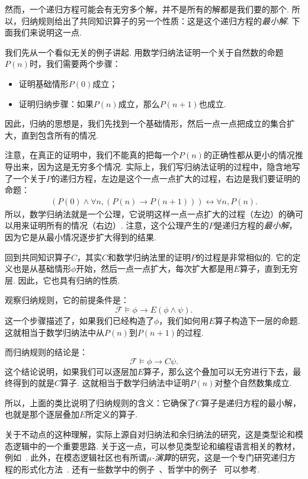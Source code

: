 然而，一个递归方程可能会有无穷多个解，并不是所有的解都是我们要的那个. 所以，归纳规则给出了共同知识算子的另一个性质：这是这个递归方程的\textit{最小解}. 下面我们来说明这一点. 

我们先从一个看似无关的例子讲起. 用数学归纳法证明一个关于自然数的命题$P(n)$时，我们需要两个步骤：
\begin{itemize}
    \item 证明基础情形$P(0)$成立；
    \item 证明归纳步骤：如果$P(n)$成立，那么$P(n+1)$也成立. 
\end{itemize}
因此，归纳的思想是，我们先找到一个基础情形，然后一点一点把成立的集合扩大，直到包含所有的情况. 

注意，在真正的证明中，我们不能真的把每一个$P(n)$的正确性都从更小的情况推导出来，因为这是无穷多个情况. 实际上，我们写归纳法证明的过程中，隐含地写了一个关于$P$的递归方程，左边是这个一点一点扩大的过程，右边是我们要证明的命题：
\begin{align*}
    (P(0)\wedge\forall n,(P(n)\to P(n+1)))\leftrightarrow\forall n,P(n).
\end{align*}
所以，数学归纳法就是一个公理，它说明这样一点一点扩大的过程（左边）的确可以用来证明所有的情况（右边）. 注意，这个公理产生的$P$是递归方程的\textit{最小解}，因为它是从最小情况逐步扩大得到的结果. 

回到共同知识算子$C$，其实$C$和数学归纳法里的证明$P$的过程是非常相似的. 它的定义也是从基础情形$\phi$开始，然后一点一点扩大，每次扩大都是用$E$算子，直到无穷层. 因此，它也具有归纳的性质. 

观察归纳规则，它的前提条件是：
\[\mathcal F\vDash \phi\to E(\phi\wedge\psi).\]
这一个步骤描述了，如果我们已经构造了$\phi$，我们如何用$E$算子构造下一层的命题. 这就相当于数学归纳法中从$P(n)$到$P(n+1)$的过程. 

而归纳规则的结论是：
\[\mathcal  F\vDash \phi\to C\psi.\]
这个结论说明，如果我们可以逐层加$E$算子，那么这个叠加可以无穷进行下去，最终得到的就是$C$算子. 这就相当于数学归纳法中证明$P(n)$对整个自然数集成立. 

所以，上面的类比说明了归纳规则的含义：它确保了$C$算子是递归方程的最小解，也就是那个逐层叠加$E$所定义的算子. 

\begin{remark}
    关于不动点的这种理解，实际上源自对归纳法和余归纳法的研究，这是类型论和模态逻辑中的一个重要思路. 关于这一点，可以参见类型论和编程语言相关的教材，例如~\cite{pierceTypesProgrammingLanguages2002,pierceSoftwareFoundationsVolume,avigadTheoremProvingLean}. 此外，在模态逻辑社区也有所谓\textit{$\mu$-演算}的研究，这是一个专门研究递归方程的形式化方法~\cite{kozenResultsPropositionalMcalculus1982}. 还有一些数学中的例子~\cite{abdelgawadInductionCoinductionFixed2019}、哲学中的例子~\cite{linneboPredicativeImpredicativeDefinitions} 可以参考. 
\end{remark}

